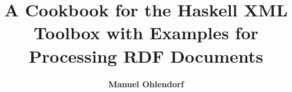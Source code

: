 \documentclass[11pt,a4paper,headsepline, bibtotoc]{scrreprt}
\begin{document}
\subject{A Thesis Submitted in Partial Fulfillment
of the Requirements for the Degree of Master of Science (MSc.)}
\title{ \vspace{15pt}A Cookbook for the Haskell XML Toolbox with Examples for Processing RDF Documents}
\author{\textbf{Manuel Ohlendorf}}
\publishers
  {\center
    \vspace{100pt}
   \texttt{[image: images/fhlogo.eps]}\\
    \vspace{1ex}
    Computer Science Department
  }
\maketitle

\tableofcontents
\listoffigures
\lstlistoflistings

\end{document}
